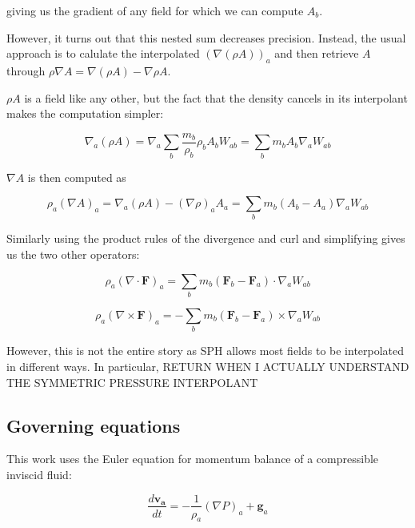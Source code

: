 \documentclass[../main.tex]{subfiles}
\begin{document}
giving us the gradient of any field for which we can compute $A_b$.

However, it turns out \autocite{monaghan1992} that this nested sum decreases precision. Instead, the usual approach is to calulate the interpolated $(\nabla(\rho A))_a$ and then retrieve $A$ through $\rho\nabla A = \nabla(\rho A) - \nabla\rho A$.

$\rho A$ is a field like any other, but the fact that the density cancels in its interpolant makes the computation simpler:

\begin{equation}
    \nabla_a (\rho A) = \nabla_a \sum_b \frac{m_b}{\rho_b} \rho_b A_b W_{ab} = \sum_b m_b A_b \nabla_a W_{ab}
\end{equation}

$\nabla A$ is then computed as

\begin{equation}
    \rho_a (\nabla A)_a = \nabla_a (\rho A) - (\nabla\rho)_a A_a = \sum_b m_b (A_b - A_a) \nabla_a W_{ab}
\end{equation}

Similarly using the product rules of the divergence and curl and simplifying gives us the two other operators:

\begin{equation}
    \rho_a (\nabla\cdot\bm{F})_a = \sum_b m_b (\bm{F}_b - \bm{F}_a) \cdot \nabla_a W_{ab}
\end{equation}

\begin{equation}
    \rho_a (\nabla\times\bm{F})_a = - \sum_b m_b (\bm{F}_b - \bm{F}_a) \times \nabla_a W_{ab}
\end{equation}

However, this is not the entire story as SPH allows most fields to be interpolated in different ways. In particular, RETURN WHEN I ACTUALLY UNDERSTAND THE SYMMETRIC PRESSURE INTERPOLANT


\subsection{Governing equations}

This work uses the Euler equation for momentum balance of a compressible inviscid fluid:

\begin{equation}
    \frac{d\bm{v_a}}{dt} = - \frac{1}{\rho_a} (\nabla P)_a + \bm{g}_a
\end{equation}
\end{document}
